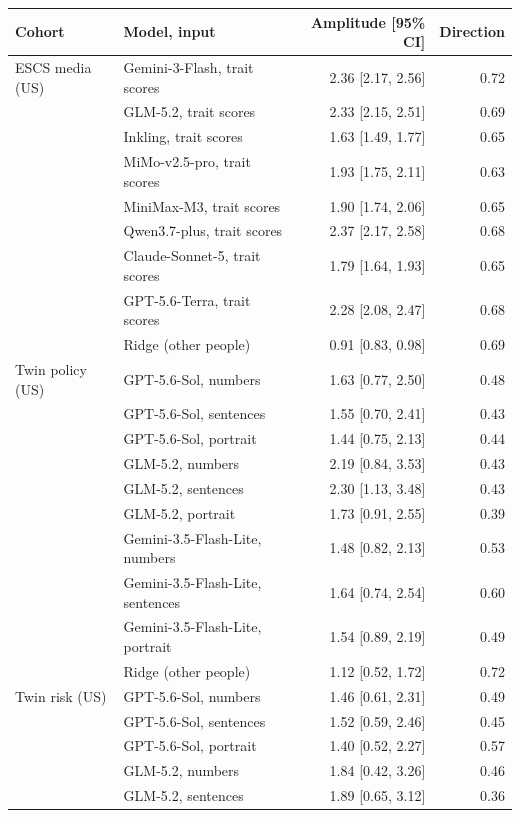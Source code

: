 \begin{table}[p]\centering\scriptsize\setlength{\tabcolsep}{4pt}
\begin{tabular}{@{}llrr@{}}\toprule
Cohort & Model, input & Amplitude [95\% CI] & Direction \\ \midrule
ESCS media (US) & Gemini-3-Flash, trait scores & 2.36 [2.17, 2.56] & 0.72 \\
 & GLM-5.2, trait scores & 2.33 [2.15, 2.51] & 0.69 \\
 & Inkling, trait scores & 1.63 [1.49, 1.77] & 0.65 \\
 & MiMo-v2.5-pro, trait scores & 1.93 [1.75, 2.11] & 0.63 \\
 & MiniMax-M3, trait scores & 1.90 [1.74, 2.06] & 0.65 \\
 & Qwen3.7-plus, trait scores & 2.37 [2.17, 2.58] & 0.68 \\
 & Claude-Sonnet-5, trait scores & 1.79 [1.64, 1.93] & 0.65 \\
 & GPT-5.6-Terra, trait scores & 2.28 [2.08, 2.47] & 0.68 \\
 & Ridge (other people) & 0.91 [0.83, 0.98] & 0.69 \\
\midrule
Twin policy (US) & GPT-5.6-Sol, numbers & 1.63 [0.77, 2.50] & 0.48 \\
 & GPT-5.6-Sol, sentences & 1.55 [0.70, 2.41] & 0.43 \\
 & GPT-5.6-Sol, portrait & 1.44 [0.75, 2.13] & 0.44 \\
 & GLM-5.2, numbers & 2.19 [0.84, 3.53] & 0.43 \\
 & GLM-5.2, sentences & 2.30 [1.13, 3.48] & 0.43 \\
 & GLM-5.2, portrait & 1.73 [0.91, 2.55] & 0.39 \\
 & Gemini-3.5-Flash-Lite, numbers & 1.48 [0.82, 2.13] & 0.53 \\
 & Gemini-3.5-Flash-Lite, sentences & 1.64 [0.74, 2.54] & 0.60 \\
 & Gemini-3.5-Flash-Lite, portrait & 1.54 [0.89, 2.19] & 0.49 \\
 & Ridge (other people) & 1.12 [0.52, 1.72] & 0.72 \\
\midrule
Twin risk (US) & GPT-5.6-Sol, numbers & 1.46 [0.61, 2.31] & 0.49 \\
 & GPT-5.6-Sol, sentences & 1.52 [0.59, 2.46] & 0.45 \\
 & GPT-5.6-Sol, portrait & 1.40 [0.52, 2.27] & 0.57 \\
 & GLM-5.2, numbers & 1.84 [0.42, 3.26] & 0.46 \\
 & GLM-5.2, sentences & 1.89 [0.65, 3.12] & 0.36 \\

\end{tabular}
\end{table}
